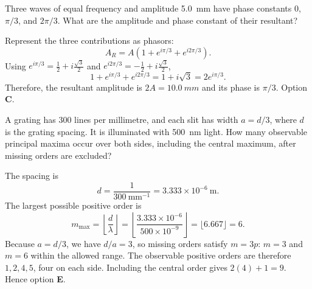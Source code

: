 \begin{quizquestion}[
  id=phy104-wave-051,
  topic=waves-and-sound,
  difficulty=challenge,
  marks=3,
  correct=C,
  tags={superposition,phasors,resultant-wave},
  outcome={Combine several equal-frequency waves by phasor addition}
]
  Three waves of equal frequency and amplitude \SI{5.0}{mm} have phase constants \(0\), \(\pi/3\), and \(2\pi/3\). What are the amplitude and phase constant of their resultant?
\end{quizquestion}
\begin{quizsolution}
  Represent the three contributions as phasors:
  \[
    A_R=A\left(1+e^{i\pi/3}+e^{i2\pi/3}\right).
  \]
  Using \(e^{i\pi/3}=\tfrac12+i\tfrac{\sqrt3}{2}\) and \(e^{i2\pi/3}=-\tfrac12+i\tfrac{\sqrt3}{2}\),
  \[
    1+e^{i\pi/3}+e^{i2\pi/3}=1+i\sqrt3=2e^{i\pi/3}.
  \]
  Therefore, the resultant amplitude is \(2A=\SI{10.0}{mm}\) and its phase is \(\pi/3\). Option \textbf{C}.
\end{quizsolution}

\begin{quizquestion}[
  id=phy104-opt-060,
  topic=optics,
  difficulty=challenge,
  marks=3,
  correct=E,
  tags={diffraction-grating,missing-orders,order-limit},
  outcome={Combine grating-order limits with missing-order conditions}
]
  A grating has \(300\) lines per millimetre, and each slit has width \(a=d/3\), where \(d\) is the grating spacing. It is illuminated with \SI{500}{nm} light. How many observable principal maxima occur over both sides, including the central maximum, after missing orders are excluded?
\end{quizquestion}
\begin{quizsolution}
  The spacing is
  \[
    d=\frac{1}{300\ \mathrm{mm}^{-1}}=3.333\times10^{-6}\ \mathrm{m}.
  \]
  The largest possible positive order is
  \[
    m_{\max}=\left\lfloor\frac{d}{\lambda}\right\rfloor
    =\left\lfloor\frac{3.333\times10^{-6}}{500\times10^{-9}}\right\rfloor
    =\lfloor6.667\rfloor=6.
  \]
  Because \(a=d/3\), we have \(d/a=3\), so missing orders satisfy \(m=3p\): \(m=3\) and \(m=6\) within the allowed range. The observable positive orders are therefore \(1,2,4,5\), four on each side. Including the central order gives \(2(4)+1=9\). Hence option \textbf{E}.
\end{quizsolution}
